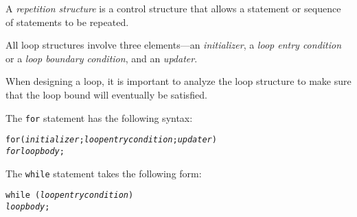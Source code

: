 \begin{SMBL}
\item  A {\it repetition structure} is a control structure
that allows a statement or sequence of statements to be repeated.

\item  All loop structures involve three elements---an {\it initializer}, 
a {\it loop entry condition} or a {\it loop boundary condition}, and
an {\it updater}.

\item When designing a loop, it is important to analyze the loop structure
to make sure that the loop bound will eventually be satisfied.

\item The {\tt for} statement has the following syntax:

\begin{alltt}
for ( {\it initializer} ; {\it loop entry condition} ; {\it updater} )
    {\it for loop body} ; 
\end{alltt} 


\item The {\tt while} statement takes the following form:

\begin{jjjlisting}
\begin{alltt}
{\tt while (} {\it loop entry condition} {\tt)}   
    {\it loop body} ;
\end{alltt}
\end{jjjlisting}


\end{SMBL}
